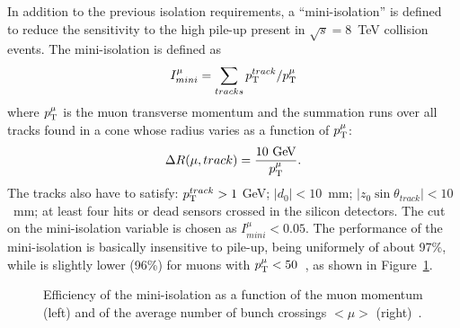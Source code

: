 In addition to the previous isolation requirements, a ``mini-isolation'' is 
defined~\cite{topcommon2013} to reduce the sensitivity to the high pile-up present
in $\sqrt{s} = $8~TeV collision events.
The mini-isolation is defined as 
\begin{equation}\label{eq:miniisol}
I_{mini}^{\mu} = \sum_{tracks} \pt^{track}/\pt^{\mu}
\end{equation}
where $\pt^{\mu}$ is the muon transverse momentum and the summation runs over
all tracks found in a cone whose radius varies as a function of $\pt^{\mu}$:
\begin{equation}\label{eq:minicone}
\Delta R(\mu,track)=\dfrac{10\gev}{\pt^{\mu}}.
\end{equation}
The tracks also have to satisfy: $\pt^{track}>1~$GeV; $|d_0| < 10$~mm;
$|z_0 \sin\theta_{track}| <10$~mm; at least four hits or dead sensors crossed in the silicon detectors.
The cut on the mini-isolation variable is chosen as $I_{mini}^{\mu}<0.05$.
The performance of the mini-isolation is basically insensitive to pile-up,
being uniformely of about 97\%, while is slightly lower (96\%)
for muons with $\pt^{\mu}<50$~\gev, as 
shown in Figure~\ref{fig:miniisoleff}.

\begin{figure}[tb]\begin{center}
	\caption{Efficiency of the mini-isolation as a function of the muon momentum (left) and of the average number
        of bunch crossings $<\mu>$ (right)~\cite{topcommon2013}.\label{fig:miniisoleff}}
\end{center}\end{figure}


